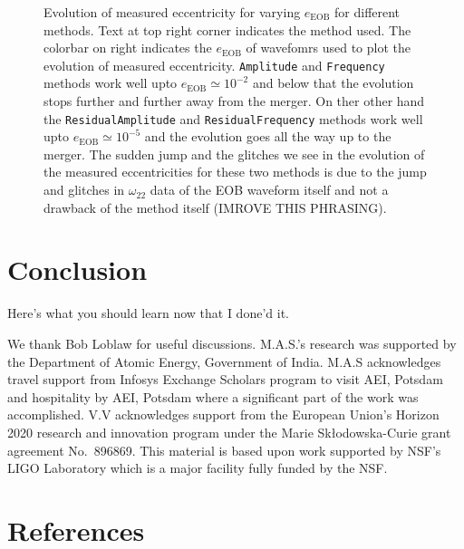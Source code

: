 \documentclass[aps,prd,amsmath,floats,floatfix, twocolumn,
superscriptaddress,nofootinbib,showpacs]{revtex4-1}
\begin{document}
\begin{figure}[thb]
\caption{Evolution of measured eccentricity for varying $e_{\text{EOB}}$ for different methods. Text at top right corner indicates the method used. The colorbar on right indicates the $e_{\text{EOB}}$ of wavefomrs used to plot the evolution of measured eccentricity. \texttt{Amplitude} and \texttt{Frequency} methods work well upto $e_{\text{EOB}} \simeq 10^{-2}$ and below that the evolution stops further and further away from the merger. On ther other hand the \texttt{ResidualAmplitude} and \texttt{ResidualFrequency} methods work well upto $e_{\text{EOB}} \simeq 10^{-5}$ and the evolution goes all the way up to the merger. The sudden jump and the glitches we see in the evolution of the measured eccentricities for these two methods is due to the jump and glitches in $\omega_{22}$ data of the EOB waveform itself and not a drawback of the method itself (IMROVE THIS PHRASING).}
\label{fig:measured_ecc_vs_time}
\end{figure}

\section{Conclusion}
\label{sec:conclusion}
Here's what you should learn now that I done'd it.


\begin{acknowledgments}
We thank Bob Loblaw for useful discussions.
M.A.S.’s research was supported by the Department of Atomic Energy, Government of
India. M.A.S acknowledges travel support from Infosys Exchange Scholars program to visit
AEI, Potsdam and hospitality by AEI, Potsdam where a significant part of the work was
accomplished.
V.V acknowledges support from the European Union’s Horizon 2020 research and
innovation program under the Marie Skłodowska-Curie grant agreement No.~896869.
This material is based upon work supported by NSF's LIGO Laboratory which is a
major facility fully funded by the NSF.
\end{acknowledgments}

\section*{References}

\end{document}
